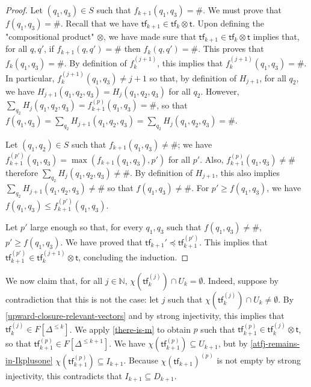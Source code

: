 \documentclass[10pt,a4paper]{article}
\let\mathbb\mathds
\renewcommand{\geq}{\geqslant}
\renewcommand{\leq}{\leqslant}
\newcommand{\nats}{\mathbb{N}}
\newcommand{\transitions}{\Delta}
\newcommand*{\dummysymb}{\#}
\newcommand*{\transfersof}[1]{F[#1]}
\newcommand*{\atf}{\mathsf{tf}}
\newcommand*{\tftimes}{\otimes}
\newcommand*{\letf}{\preceq}
\newcommand{\Tleq}[1]{\transfersof{\transitions^{\leq #1}}}
\newcommand*{\mapencoding}{\chi}
\newcommand*{\tftrans}{\mathsf{t}}
\begin{document}
\begin{appendixproof}
\begin{proof}
		Let \((q_1,q_3) \in S\) such that \(f_{k+1}(q_1,q_3) = \dummysymb\).
		We must prove that \(f(q_1,q_3) = \dummysymb\).
		Recall that we have \(\atf_{k+1} \in \atf_k \tftimes \tftrans\).
		Upon defining the "compositional product" \(\tftimes\), we have made sure that \(\atf_{k+1} \in \atf_k \tftimes {\tftrans}\) implies that, for all \(q,q'\), if \(f_{k+1}(q,q') = \dummysymb\) then \(f_k(q,q') = \dummysymb\).
		This proves that \(f_k(q_1,q_3) = \dummysymb\).
		By definition of \(f_k^{(j+1)}\), this implies that \(f_k^{(j+1)}(q_1,q_3) = \dummysymb\).
		In particular, \(f_k^{(j+1)}(q_1,q_3) \ne j+1\) so that, by definition of \(H_{j+1}\), for all \(q_2\), we have \(H_{j+1}(q_1,q_2,q_3) = H_j(q_1,q_2,q_3)\) for all \(q_2\).
		However, \(\sum_{q_2} H_{j}(q_1,q_2,q_3) = f_{k+1}^{(p)}(q_1,q_3) = \dummysymb\), so that \(f(q_1,q_3) = \sum_{q_2} H_{j+1}(q_1,q_2,q_3) = \sum_{q_2} H_j(q_1,q_2,q_3) = \dummysymb\).

		Let \((q_1,q_2) \in S\) such that \(f_{k+1}(q_1,q_3) \ne \dummysymb\); we have \(f_{k+1}^{(p')}(q_1,q_3) = \max(f_{k+1}(q_1,q_3), p')\) for all \(p'\).
		Also, \(f_{k+1}^{(p)}(q_1,q_3) \ne \dummysymb\) therefore \(\sum_{q_2} H_j(q_1,q_2,q_3) \ne \dummysymb\).
		By definition of \(H_{j+1}\), this also implies \(\sum_{q_2} H_{j+1}(q_1,q_2,q_3) \ne \dummysymb\) so that \(f(q_1,q_3) \ne \dummysymb\).
		For \(p' \geq f(q_1,q_3)\), we have \(f(q_1,q_3) \leq f_{k+1}^{(p')}(q_1,q_3)\).

		Let \(p'\) large enough so that, for every \(q_1,q_3\) such that \(f(q_1,q_3) \ne \dummysymb\), \(p' \geq f(q_1,q_3)\).
		We have proved that \(\atf_{k+1}' \letf \atf_{k+1}^{(p')}\).
		This implies that \(\atf_{k+1}^{(p')} \in \atf_k^{(j+1)} \tftimes \tftrans\), concluding the induction.
	\end{proof}

	We now claim that, for all \(j \in \nats\), \(\mapencoding(\atf_k^{(j)}) \cap U_k = \emptyset\).
	Indeed, suppose by contradiction that this is not the case: let \(j\) such that \(\mapencoding(\atf_k^{(j)}) \cap U_k \ne \emptyset\).
	By \cref{upward-closure-relevant-vectors} and by strong injectivity, this implies that \(\atf_k^{(j)} \in \Tleq{k}\).
	We apply \cref{there-is-m} to obtain \(p\) such that \(\atf_{k+1}^{(p)} \in \atf_k^{(j)} \tftimes \tftrans\), so that \(\atf_{k+1}^{(p)} \in \Tleq{k+1}\).
	We have \(\mapencoding(\atf_{k+1}^{(p)}) \subseteq U_{k+1}\), but by \cref{atfj-remains-in-Ikplusone} \(\mapencoding(\atf_{k+1}^{(p)}) \subseteq I_{k+1}\).
	Because \(\mapencoding(\atf_{k+1})^{(p)} \) is not empty by strong injectivity, this contradicts that \(I_{k+1} \subseteq D_{k+1}\).


\end{appendixproof}
\end{document}
